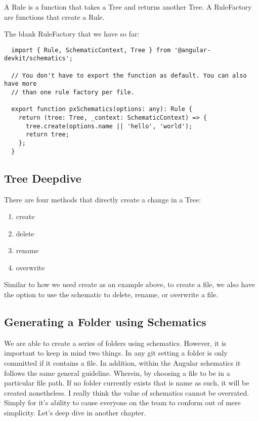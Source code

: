 A Rule is a function that takes a Tree and returns another Tree. A RuleFactory
are functions that create a Rule.

The blank RuleFactory that we have so far:

\begin{lstlisting}
  import { Rule, SchematicContext, Tree } from '@angular-devkit/schematics';

  // You don't have to export the function as default. You can also have more
  // than one rule factory per file.

  export function pxSchematics(options: any): Rule {
    return (tree: Tree, _context: SchematicContext) => {
      tree.create(options.name || 'hello', 'world');
      return tree;
    };
  }

\end{lstlisting}


\subsection{ Tree Deepdive}
There are four methods that directly create a change in a Tree:
\begin{enumerate}
  \item create
  \item delete
  \item rename
  \item overwrite
\end{enumerate}

Similar to how we used create as an example above, to create a file, we also
have the option to use the schematic to delete, rename, or overwrite a file.

\subsection{ Generating a Folder using Schematics }
We are able to create a series of folders using schematics. However, it is
important to keep in mind two things. In any git setting a folder is only
committed if it contains a file. In addition, within the Angular schematics
it follows the same general guideline. Wherein, by choosing a file to be in a
particular file path. If no folder currently exists that is name as such, it
will be created nonetheless. I really think the value of schematics cannot be
overrated. Simply for it's ability to cause everyone on the team to conform out
of mere simplicity. Let's deep dive in another chapter.
